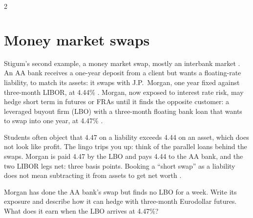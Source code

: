 \begin{paracol}{2}
\section{Money market swaps}\label{sec:irs-mmswap}

Stigum's second example, a money market swap, mostly an interbank market . An AA bank receives a one-year deposit
from a client but wants a floating-rate liability, to match its assets: it swaps with J.P.~Morgan, one year fixed against three-month LIBOR, at 4.44\%
. Morgan, now exposed to interest rate risk, may hedge short term in futures or
FRAs until it finds the opposite customer: a leveraged buyout firm (LBO) with a three-month floating bank loan that wants to swap into one year, at 4.47\%
.

\begin{nfigure}
\begin{taccts}
\quad
{}\quad
{}
\end{taccts}
\caption{A money market swap as notional parallel loans: Morgan receives 4.47 and pays 4.44, the LIBOR legs net out .}\label{fig:irs-mm}
\end{nfigure}

\begin{coursenote}
Students often object that 4.47 on a liability exceeds 4.44 on an asset, which does not look like profit. The lingo trips you up: think of the parallel loans
behind the swaps. Morgan is paid 4.47 by the LBO and pays 4.44 to the AA bank, and the two LIBOR legs net: three basis points. Booking a ``short swap'' as a
liability does not mean subtracting it from assets to get net worth .
\end{coursenote}

\begin{exercise}
Morgan has done the AA bank's swap but finds no LBO for a week. Write its exposure and describe how it can hedge with three-month Eurodollar futures. What does it
earn when the LBO arrives at 4.47\%?
\end{exercise}


\end{paracol}
